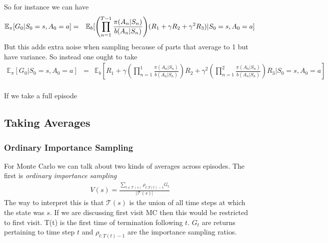 \documentclass[11pt,a4paper]{article}
\newcommand\bea{\begin{eqnarray}}
\newcommand\eea{\end{eqnarray}}
\newcommand{\nn}{\nonumber \\}
\begin{document}
So for instance we can have
\bea
\mathbb E_\pi[G_0 | S_0=s,A_0=a] &=& \mathbb E_{b}[ {\color{black} \left( \prod_{n=1}^{T-1} \frac{\pi(A_{n} | S_{n} )}{b(A_{n} | S_{n} )} \right)}   (R_{1}+ \gamma R_2 + \gamma^2 R_3)|S_0 = s,A_0=a] \nn
\eea
But this adds extra noise when sampling because of parts that average to 1 but have variance. So instead one ought to take
\bea
\mathbb E_\pi[G_0 | S_0=s,A_0=a] &=& \mathbb E_{b} [R_1 + \gamma  \left( \prod_{n=1}^{1} \frac{\pi(A_{n} | S_{n} )}{b(A_{n} | S_{n} )} \right) R_2 + \gamma^2  \left( \prod_{n=1}^{2} \frac{\pi(A_{n} | S_{n} )}{b(A_{n} | S_{n} )} \right) R_3 |S_0 = s,A_0=a] \nn
\eea

If we take a full episode

\subsection{Taking Averages}

\subsubsection{Ordinary Importance Sampling}

For Monte Carlo we can talk about two kinds of averages across episodes. The first is {\em ordinary importance sampling} 
\bea
V(s) = \frac{\sum_{t \in \mathcal T(s)} \rho_{t:T(t)-1} G_t}{|\mathcal T(s)|}
\eea
The way to interpret this is that $\mathcal T(s)$ is the union of all time steps at which the state was $s$.  If we are discussing first visit MC then this would be restricted to first visit. T(t) is the first time of termination following $t$. $G_t$ are returns pertaining to time step $t$ and $ \rho_{t:T(t)-1}$ are the importance sampling ratios.
\end{document}
